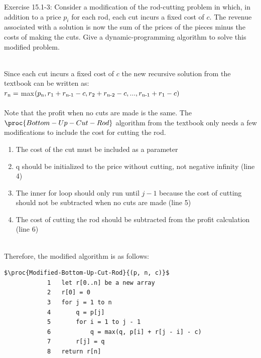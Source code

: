 \documentclass[addpoints,11pt]{exam}
\begin{document}
\begin{questions}
		
		\question[5]
		Exercise 15.1-3: Consider a modification of the rod-cutting problem in which, in addition to a price $p_i$ for each rod, each cut incurs a fixed cost of $c$.  The revenue associated with a solution is now the sum of the prices of the pieces minus the costs of making the cuts.  Give a dynamic-programming algorithm to solve this modified problem.
		\begin{solutionorbox} \\ 
			Since each cut incurs a fixed cost of $c$ the new recursive solution from the textbook can be written as: \\
			$r\textsubscript{n} = \hspace{1mm}$max$(p\textsubscript{n} , r\textsubscript{1} + r\textsubscript{n-1} - c, r\textsubscript{2} + r\textsubscript{n-2} - c, ..., r\textsubscript{n-1} + r\textsubscript{1} - c)$ \\ \\ 
			Note that the profit when no cuts are made is the same. The $\proc{Bottom-Up-Cut-Rod}$ algorithm from the textbook only needs a few modifications to include the cost for cutting the rod.
			\begin{enumerate}
				\item The cost of the cut must be included as a parameter 
				\item q should be initialized to the price without cutting, not negative infinity (line 4)
				\item The inner for loop should only run until $j - 1$ because the cost of cutting should not be subtracted when no cuts are made (line 5)
				\item The cost of cutting the rod should be subtracted from the profit calculation (line 6)
			\end{enumerate} \\ Therefore, the modified algorithm is as follows: \\
			\begin{lstlisting}[mathescape=true]
			$\proc{Modified-Bottom-Up-Cut-Rod}{(p, n, c)}$
			1   let r[0..n] be a new array
			2   r[0] = 0
			3   for j = 1 to n
			4       q = p[j]
			5       for i = 1 to j - 1
			6           q = max(q, p[i] + r[j - i] - c)
			7       r[j] = q
			8   return r[n]
			
			\end{lstlisting} \\
			

\end{solutionorbox}
\end{questions}
\end{document}
